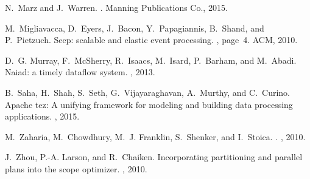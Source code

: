 \documentclass[11pt]{article}
\begin{document}
\begin{thebibliography}{10}
\begin{small}
N.~Marz and J.~Warren.
.
\newblock Manning Publications Co., 2015.

M.~Migliavacca, D.~Eyers, J.~Bacon, Y.~Papagiannis, B.~Shand, and P.~Pietzuch.
\newblock Seep: scalable and elastic event processing.
, page~4. ACM, 2010.

D.~G. Murray, F.~McSherry, R.~Isaacs, M.~Isard, P.~Barham, and M.~Abadi.
\newblock Naiad: a timely dataflow system.
, 2013.

B.~Saha, H.~Shah, S.~Seth, G.~Vijayaraghavan, A.~Murthy, and C.~Curino.
\newblock Apache tez: A unifying framework for modeling and building data
  processing applications.
, 2015.

M.~Zaharia, M.~Chowdhury, M.~J. Franklin, S.~Shenker, and I.~Stoica.
.
, 2010.

J.~Zhou, P.-A. Larson, and R.~Chaiken.
\newblock Incorporating partitioning and parallel plans into the scope
  optimizer.
, 2010.

\end{small}
\end{thebibliography}



% 
% 
\end{document}
